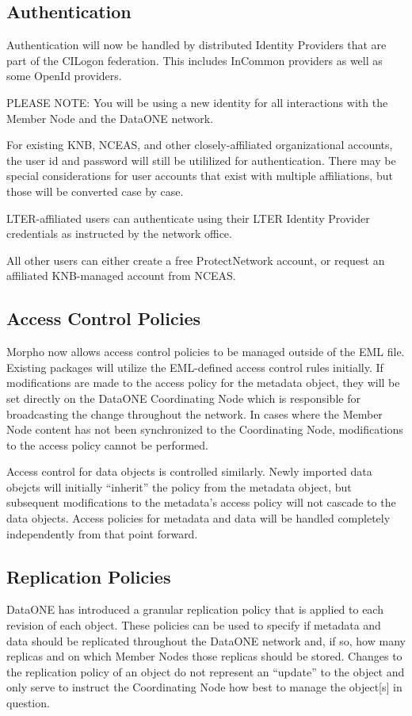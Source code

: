 \subsection{Authentication}

Authentication will now be handled by distributed Identity Providers 
that are part of the CILogon federation. This includes InCommon providers
as well as some OpenId providers.

PLEASE NOTE: You will be using a new identity for all interactions with 
the Member Node and the DataONE network.

For existing KNB, NCEAS, and other closely-affiliated organizational accounts, the user id 
and password will still be utililized for authentication. There may be special considerations 
for user accounts that exist with multiple affiliations, but those will be converted case by 
case.

LTER-affiliated users can authenticate using their LTER Identity Provider credentials
as instructed by the network office.

All other users can either create a free ProtectNetwork account, or request an affiliated 
KNB-managed account from NCEAS.

\subsection{Access Control Policies}

Morpho now allows access control policies to be managed outside of the EML
file. Existing packages will utilize the EML-defined access control rules initially.
If modifications are made to the access policy for the metadata object, they will be set
directly on the DataONE Coordinating Node which is responsible for broadcasting the change
throughout the network. In cases where the Member Node content has not been synchronized
to the Coordinating Node, modifications to the access policy cannot be performed.

Access control for data objects is controlled similarly. Newly imported data obejcts
will initially ``inherit'' the policy from the metadata object, but subsequent modifications
to the metadata's access policy will not cascade to the data objects. Access policies for 
metadata and data will be handled completely independently from that point forward.

\subsection{Replication Policies}

DataONE has introduced a granular replication policy that is applied to each 
revision of each object. These policies can be used to specify if metadata and 
data should be replicated throughout the DataONE network and, if so, how many 
replicas and on which Member Nodes those replicas should be stored. 
Changes to the replication policy of an object do not represent an ``update'' to 
the object and only serve to instruct the Coordinating Node how best to 
manage the object[s] in question.
